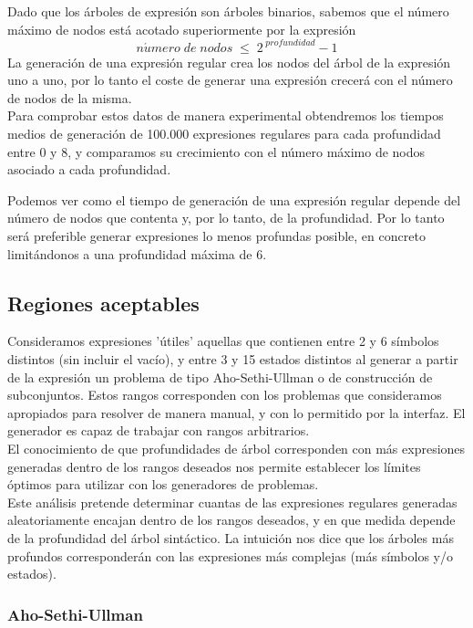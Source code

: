 Dado que los árboles de expresión son árboles binarios, sabemos que el número máximo de nodos está acotado superiormente por la expresión
\[
n\acute{u}mero \; de \; nodos \; \leq \; 2^{\;profundidad} - 1
\]
La generación de una expresión regular crea los nodos del árbol de la expresión uno a uno, por lo tanto el coste de generar una expresión crecerá con el número de nodos de la misma.
\\
Para comprobar estos datos de manera experimental obtendremos los tiempos medios de generación de 100.000 expresiones regulares para cada profundidad entre 0 y 8, y comparamos su crecimiento con el número máximo de nodos asociado a cada profundidad.


Podemos ver como el tiempo de generación de una expresión regular depende del número de nodos que contenta y, por lo tanto, de la profundidad.
Por lo tanto será preferible generar expresiones lo menos profundas posible, en concreto limitándonos a una profundidad máxima de 6.

\subsection{Regiones aceptables}

Consideramos expresiones 'útiles' aquellas que contienen entre 2 y 6 símbolos distintos (sin incluir el vacío), y entre 3 y 15 estados distintos al generar a partir de la expresión un problema de tipo Aho-Sethi-Ullman o de construcción de subconjuntos.
Estos rangos corresponden con los problemas que consideramos apropiados para resolver de manera manual, y con lo permitido por la interfaz.
El generador es capaz de trabajar con rangos arbitrarios.
\\
El conocimiento de que profundidades de árbol corresponden con más expresiones generadas dentro de los rangos deseados nos permite establecer los límites óptimos para utilizar con los generadores de problemas.
\\
Este análisis pretende determinar cuantas de las expresiones regulares generadas aleatoriamente encajan dentro de los rangos deseados, y en que medida depende de la profundidad del árbol sintáctico.
La intuición nos dice que los árboles más profundos corresponderán con las expresiones más complejas (más símbolos y/o estados).

\subsubsection{Aho-Sethi-Ullman}

